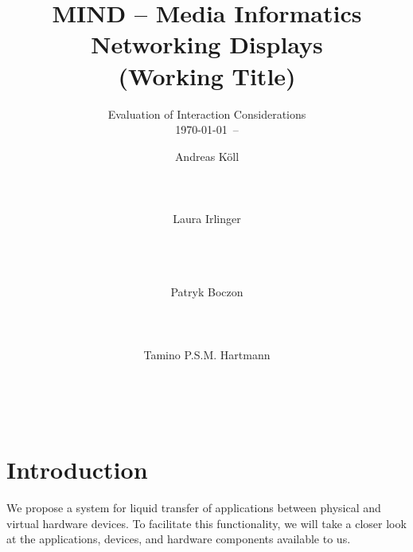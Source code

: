 \documentclass{acm_proc_article-sp}
\begin{document}

\title{MIND – Media Informatics Networking Displays \\ (Working Title)}
\subtitle{Evaluation of Interaction Considerations \\ {\normalsize \today \ – \currenttime} }

\author{
\alignauthor
Andreas Köll\\
       \\
       \\
       \\
\alignauthor
Laura Irlinger\\
       \\
       \\
       \\
\and
\alignauthor
Patryk Boczon\\
       \\
       \\
       \\
\alignauthor
Tamino P.S.M. Hartmann\\
       \\
       \\
       \\
}

\maketitle

\section{Introduction}

We propose a system for liquid transfer of applications between physical and virtual hardware devices.
To facilitate this functionality, we will take a closer look at the applications, devices, and hardware components available to us.
\end{document}
